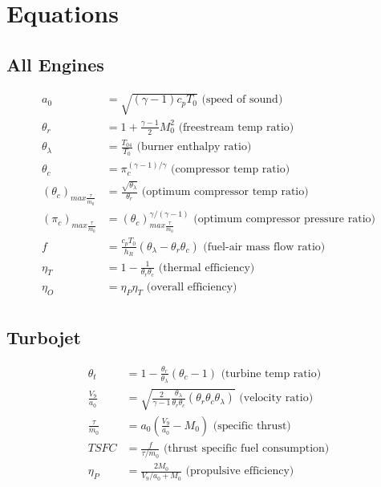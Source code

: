\documentclass[]{aiaa-tc}%
\begin{document}
\section{Equations}

\subsection{All Engines}

\begin{align*}
	a_{0} &= \sqrt{(\gamma-1)c_{p}T_{0}} \text{ (speed of sound)}\\
	\theta_{r} &= 1 + \frac{\gamma-1}{2}M_{0}^{2} \text{ (freestream temp ratio)}\\
	\theta_{\lambda} &= \frac{T_{04}}{T_{0}} \text{ (burner enthalpy ratio)}\\
	\theta_{c} &= \pi_{c}^{(\gamma-1)/\gamma} \text{ (compressor temp ratio)}\\
	(\theta_{c})_{max\frac{\tau}{\dot{m}_{0}}} &= \frac{\sqrt{\theta_{\lambda}}}{\theta_{r}} 
		\text{ (optimum compressor temp ratio)}\\
	(\pi_{c})_{max\frac{\tau}{\dot{m}_{0}}} &= 
		(\theta_{c})_{max\frac{\tau}{\dot{m}_{0}}}^{\gamma/(\gamma-1)}
		\text{ (optimum compressor pressure ratio)}\\
	f &= \frac{c_{p}T_{0}}{h_{R}}(\theta_{\lambda}-\theta_{r}\theta_{c})
		\text{ (fuel-air mass flow ratio)}\\
	\eta_{T} &= 1 - \frac{1}{\theta_{r}\theta_{c}} \text{ (thermal efficiency)}\\	
	\eta_{O} &= \eta_{P}\eta_{T} \text{ (overall efficiency)}\\
\end{align*}

\subsection{Turbojet}

\begin{align*}
	\theta_{t} &= 1 - \frac{\theta_{r}}{\theta_{\lambda}}(\theta_{c}-1)
		\text{ (turbine temp ratio)}\\
	\frac{V_{9}}{a_{0}} &= \sqrt{\frac{2}{\gamma-1}\frac{\theta_{\lambda}}{\theta_{r}\theta_{c}}
		(\theta_{r}\theta_{c}\theta_{\lambda})} \text{ (velocity ratio)}\\
	\frac{\tau}{\dot{m}_{0}} &= a_{0}\left(\frac{V_{9}}{a_{0}}-M_{0}\right)
		\text{ (specific thrust)}\\
	TSFC &= \frac{f}{\tau/\dot{m}_{0}} \text{ (thrust specific fuel consumption)}\\
	\eta_{P} &= \frac{2M_{0}}{V_{9}/a_{0}+M_{0}} \text{ (propulsive efficiency)}\\	
\end{align*}
\end{document}
